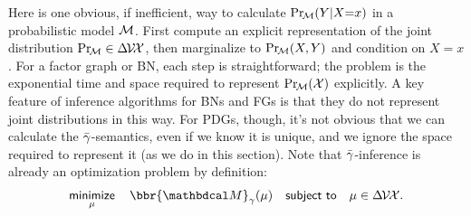 Here is one obvious, if inefficient, way to calculate $\Pr_{\!\cal M}(Y|X{=}x)$ in a
probabilistic model $\cal M$. 
First compute an explicit representation of the joint distribution 
$\Pr_{\!\cal M} \in \Delta\mskip-2mu\mathcal V\!\mathcal X$, 
then marginalize to 
$\Pr_{\!\cal M}(X,Y)$ and condition on $X{=}x$.
%
For a factor graph or BN,
each step is
straightforward;
the problem is the exponential time and space required to represent $\Pr_{\!\cal M}(\mathcal X)$ explicitly.
A key feature of inference algorithms for BNs and FGs is that they
do not represent joint distributions in this way.
%
For PDGs, though, it's not
obvious that
we can calculate the ${\bar\gamma}$-semantics,
even if
we know it is unique, and
we ignore the space required to represent it (as we do in this section).
Note that ${\bar\gamma}$-inference is already an optimization problem by definition:
\[
    \minimize_\mu\quad
        \bbr{\dg M}_\gamma(\mu)
    \quad \subjto\quad \mu \in \Delta\mskip-2mu\V\mskip-2mu\X.
\]
